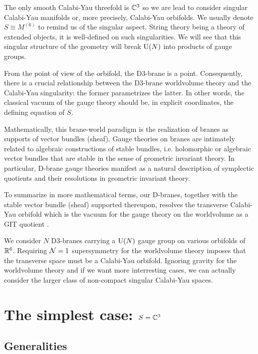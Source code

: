 \documentclass[a4paper,10pt]{article}
\begin{document}
    The only smooth Calabi-Yau threefold is $\mathbb{C}^3$ so we are lead to consider singular Calabi-Yau manifolds or, more precisely, Calabi-Yau orbifolds. We usually denote $S\equiv M^{(6)}$ to remind us of the singular aspect. String theory being a theory of extended objects, it is well-defined on such singularities. We will see that this singular structure of the geometry will break $\text{U}(N)$ into products of gauge groups.
    
    From the point of view of the orbifold, the D$3$-brane is a point. Consequently, there is a crucial relationship between the D$3$-brane worldvolume theory and the Calabi-Yau singularity: the former parametrizes the latter. In other words, the classical vacuum of the gauge theory should be, in explicit coordinates, the defining equation of $S$.

    Mathematically, this brane-world paradigm is the realization of branes as supports of vector bundles (sheaf). Gauge theories on branes are intimately related to algebraic constructions of stable bundles, i.e. holomorphic or algebraic vector bundles that are stable in the sense of geometric invariant theory. In particular, D-brane gauge theories manifest as a natural description of symplectic quotients and their resolutions in geometric invariant theory.

    To summarize in more mathematical terms, our D-branes, together with the stable vector bundle (sheaf) supported thereupon, resolves the transverse Calabi-Yau orbifold which is the vacuum for the gauge theory on the worldvolume as a GIT quotient \marker.

    \begin{result}
        We consider $N$ D$3$-branes carrying a $\text{U}(N)$ gauge group on various orbifolds of $\mathbb{R}^6$. Requiring $\mathcal{N}=1$ supersymmetry for the worldvolume theory imposes that the transverse space must be a Calabi-Yau orbifold. Ignoring gravity for the worldvolume theory and if we want more interresting cases, we can actually consider the larger class of non-compact singular Calabi-Yau spaces.
    \end{result}
    

\section{The simplest case: $S=\mathbb{C}^3$}

    \subsection{Generalities}
\end{document}
